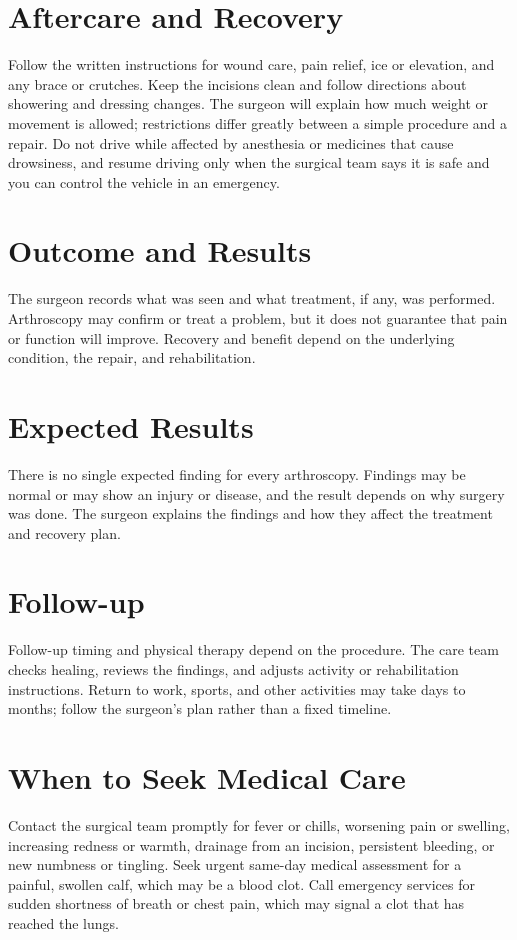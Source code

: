 \section*{Aftercare and Recovery}
Follow the written instructions for wound care, pain relief, ice or elevation, and any brace or crutches. Keep the incisions clean and follow directions about showering and dressing changes. The surgeon will explain how much weight or movement is allowed; restrictions differ greatly between a simple procedure and a repair. Do not drive while affected by anesthesia or medicines that cause drowsiness, and resume driving only when the surgical team says it is safe and you can control the vehicle in an emergency.

\section*{Outcome and Results}
The surgeon records what was seen and what treatment, if any, was performed. Arthroscopy may confirm or treat a problem, but it does not guarantee that pain or function will improve. Recovery and benefit depend on the underlying condition, the repair, and rehabilitation.

\section*{Expected Results}
There is no single expected finding for every arthroscopy. Findings may be normal or may show an injury or disease, and the result depends on why surgery was done. The surgeon explains the findings and how they affect the treatment and recovery plan.

\section*{Follow-up}
Follow-up timing and physical therapy depend on the procedure. The care team checks healing, reviews the findings, and adjusts activity or rehabilitation instructions. Return to work, sports, and other activities may take days to months; follow the surgeon's plan rather than a fixed timeline.

\section*{When to Seek Medical Care}
Contact the surgical team promptly for fever or chills, worsening pain or swelling, increasing redness or warmth, drainage from an incision, persistent bleeding, or new numbness or tingling. Seek urgent same-day medical assessment for a painful, swollen calf, which may be a blood clot. Call emergency services for sudden shortness of breath or chest pain, which may signal a clot that has reached the lungs.

